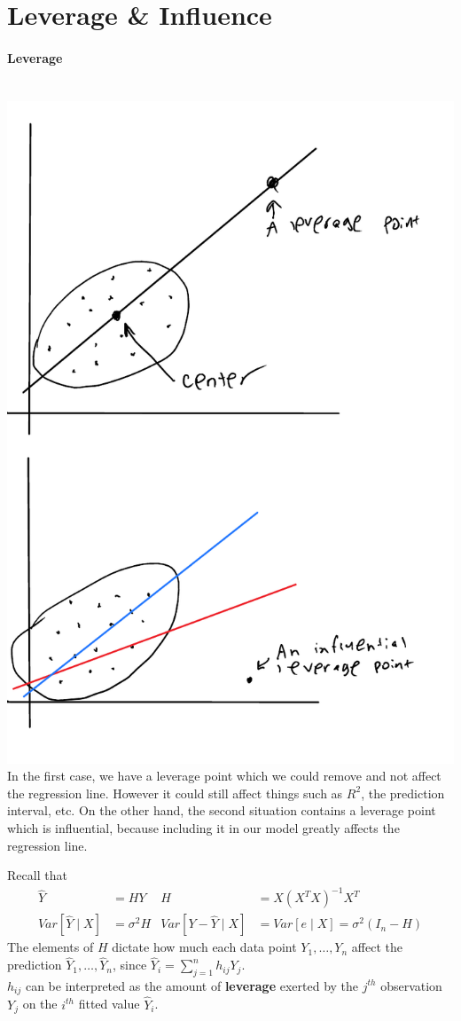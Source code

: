 \documentclass[12 pt]{article}
\begin{document}
\section{Leverage \& Influence}
\paragraph{Leverage}
~\\\includegraphics[width=.5\textwidth]{33.pdf}
\\ In the first case, we have a leverage point which we could remove
and not affect the regression line. However it could still affect
things such as $R^2$, the prediction interval, etc. On the other hand,
the second situation contains a leverage point which is influential,
because including it in our model greatly affects the regression line.

Recall that
\begin{align*}
  \hat{Y} & = HY & H & = X(X^TX)^{-1}X^T
  \\ Var[\hat{Y} \mid X] & = \sigma^2 H & Var[Y - \hat{Y} \mid X] & = Var[e \mid X] = \sigma^2 (I_n - H)
\end{align*}
The elements of $H$ dictate how much each data point $Y_1, \ldots,
Y_n$ affect the prediction $\hat{Y}_1, \ldots, \hat{Y}_n$, since
$\hat{Y}_i = \sum_{j=1}^n h_{ij}Y_j$.
\\ $h_{ij}$ can be interpreted as the amount of \textbf{leverage}
exerted by the $j^{th}$ observation $Y_j$ on the $i^{th}$ fitted value
$\hat{Y}_i$.
\end{document}
